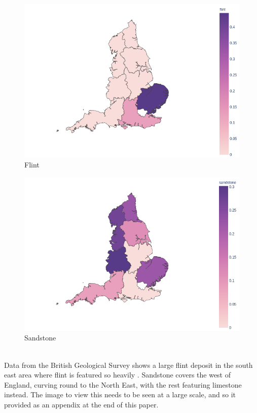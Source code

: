 \documentclass[11pt]{article}
\begin{document}
\begin{minipage}{0.45\textwidth}
	\begin{figure}[H]
		\centering
		\includegraphics[width=\textwidth]{flint.png}
		\caption{Flint}
	\end{figure}
\end{minipage}
\begin{minipage}{0.45\textwidth}
	\begin{figure}[H]
		\centering
		\includegraphics[width=\textwidth]{sandstone.png}
		\caption{Sandstone}
	\end{figure}
\end{minipage}
\vspace{1cm}
\\
Data from the British Geological Survey shows a large flint deposit in the south east area where flint is featured so heavily \cite{bgs}. Sandstone covers the west of England, curving round to the North East, with the rest featuring limestone instead. The image to view this needs to be seen at a large scale, and so it provided as an appendix at the end of this paper.
\end{document}
